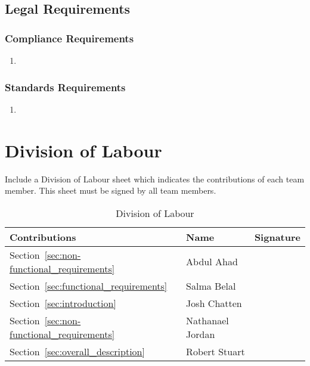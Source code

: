 \documentclass[]{article}
\begin{document}

\subsection{Legal Requirements}%
\label{sub:legal_requirements}

\subsubsection{Compliance Requirements}%
\label{ssub:compliance_requirements}
\begin{enumerate}[{LR}1. ]
	\item 
\end{enumerate}

\subsubsection{Standards Requirements}%
\label{ssub:standards_requirements}
\begin{enumerate}[{LR}1. ]
	\item 
\end{enumerate}


\newpage
\appendix
\section{Division of Labour}%
\label{sec:division_of_labour}
\color{red}
Include a Division of Labour sheet which indicates the contributions of each team member. This sheet
must be signed by all team members.
\color{black}

\begin{table}[htbp]
\caption{Division of Labour}
\vspace{-0.06in}
\begin{center}
\setlength{\extrarowheight}{4.0pt}
\begin{tabular}{m{} m{} m{}} 
\hline
\textbf{Contributions} & \textbf{Name} & \textbf{Signature}\\
\hline
Section~\ref{sec:non-functional_requirements} & Abdul Ahad & \\
\hline
Section~\ref{sec:functional_requirements} & Salma Belal & \\
\hline
Section~\ref{sec:introduction} & Josh Chatten & \\
\hline
Section~\ref{sec:non-functional_requirements} & Nathanael Jordan  & \\
\hline
Section~\ref{sec:overall_description} & Robert Stuart & \\
\hline
\end{tabular}
\end{center}
\label{divOfLabour}
\end{table}
\end{document}
